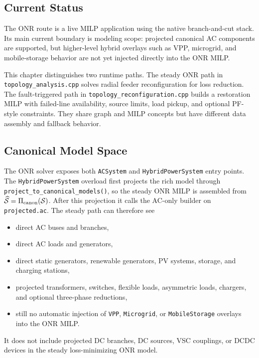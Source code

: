 \subsection{Current Status}

The ONR route is a live MILP application using the native branch-and-cut stack.
Its main current boundary is modeling scope: projected canonical AC components
are supported, but higher-level hybrid overlays such as VPP, microgrid, and
mobile-storage behavior are not yet injected directly into the ONR MILP.

This chapter distinguishes two runtime paths.  The steady ONR path in
\texttt{topology\_analysis.cpp} solves radial feeder reconfiguration for loss
reduction.  The fault-triggered path in \texttt{topology\_reconfiguration.cpp}
builds a restoration MILP with failed-line availability, source limits, load
pickup, and optional PF-style constraints.  They share graph and MILP concepts
but have different data assembly and fallback behavior.

\subsection{Canonical Model Space}

The ONR solver exposes both \texttt{ACSystem} and \texttt{HybridPowerSystem}
entry points.  The \texttt{HybridPowerSystem} overload first projects the rich
model through \texttt{project\_to\_canonical\_models()}, so the steady ONR MILP
is assembled from \(\widehat{\mathcal{S}}=\Pi_{\mathrm{canon}}(\mathcal{S})\).
After this projection it calls the AC-only builder on
\texttt{projected.ac}.  The steady path can therefore see
\begin{itemize}
  \item direct AC buses and branches,
  \item direct AC loads and generators,
  \item direct static generators, renewable generators, PV systems, storage, and charging stations,
  \item projected transformers, switches, flexible loads, asymmetric loads, chargers, and optional three-phase reductions,
  \item still no automatic injection of \texttt{VPP}, \texttt{Microgrid}, or \texttt{MobileStorage} overlays into the ONR MILP.
\end{itemize}
It does not include projected DC branches, DC sources, VSC couplings, or DCDC
devices in the steady loss-minimizing ONR model.

